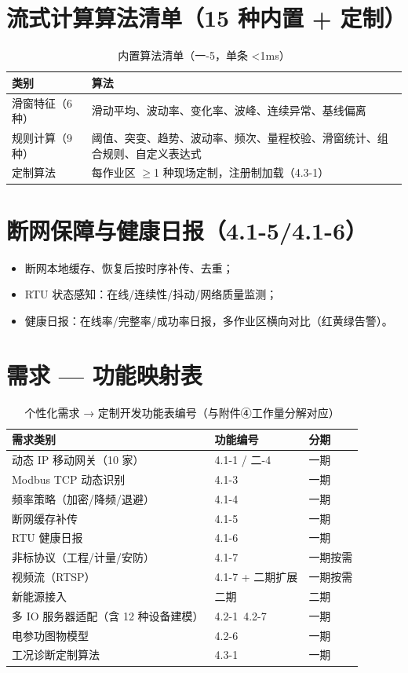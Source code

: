 \documentclass[11pt,a4paper]{ctexart}
\begin{document}
\section{流式计算算法清单（15 种内置 + 定制）}

\begin{table}[H]\centering
\caption{内置算法清单（一-5，单条 <1ms）}
\begin{tabular}{p{3.0cm} p{10.0cm}}
\toprule
\textbf{类别} & \textbf{算法} \\
\midrule
滑窗特征（6 种） & 滑动平均、波动率、变化率、波峰、连续异常、基线偏离 \\
规则计算（9 种） & 阈值、突变、趋势、波动率、频次、量程校验、滑窗统计、组合规则、自定义表达式 \\
\midrule
定制算法 & 每作业区 $\geq$1 种现场定制，注册制加载（4.3-1） \\
\bottomrule
\end{tabular}
\end{table}

\section{断网保障与健康日报（4.1-5/4.1-6）}

\begin{itemize}[leftmargin=*]
  \item 断网本地缓存、恢复后按时序补传、去重；
  \item RTU 状态感知：在线/连续性/抖动/网络质量监测；
  \item 健康日报：在线率/完整率/成功率日报，多作业区横向对比（红黄绿告警）。
\end{itemize}

\section{需求 — 功能映射表}

\begin{longtable}{p{5.2cm} p{3.2cm} p{2.4cm}}
\caption{个性化需求 → 定制开发功能表编号（与附件④工作量分解对应）}\\
\toprule
\textbf{需求类别} & \textbf{功能编号} & \textbf{分期} \\
\midrule
动态 IP 移动网关（10 家） & 4.1-1 / 二-4 & 一期 \\
Modbus TCP 动态识别 & 4.1-3 & 一期 \\
频率策略（加密/降频/退避） & 4.1-4 & 一期 \\
断网缓存补传 & 4.1-5 & 一期 \\
RTU 健康日报 & 4.1-6 & 一期 \\
非标协议（工程/计量/安防） & 4.1-7 & 一期按需 \\
视频流（RTSP） & 4.1-7 + 二期扩展 & 一期按需 \\
新能源接入 & 二期 & 二期 \\
多 IO 服务器适配（含 12 种设备建模） & 4.2-1~4.2-7 & 一期 \\
电参功图物模型 & 4.2-6 & 一期 \\
工况诊断定制算法 & 4.3-1 & 一期 \\
\bottomrule
\end{longtable}
\end{document}
